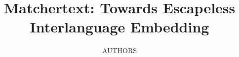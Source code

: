 \documentclass[fullpage,twocolumn]{article}
\begin{document}
\title{Matchertext: Towards Escapeless Interlanguage Embedding}

\author{AUTHORS}

\maketitle











\arxiv{

}{

}
\end{document}
